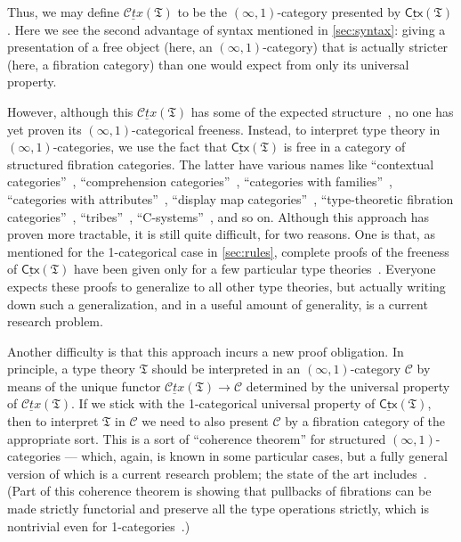 \documentclass[10pt]{article}
\def\oo{\ensuremath{\infty}}
\def\io{\ensuremath{(\oo,1)}}
\def\C{\mathscr{C}}
\def\fT{\mathfrak{T}}
\def\cCtx{\underline{\mathscr{C}\!\mathit{tx}}}
\def\cCtxT{\cCtx(\fT)}
\def\sCtx{\underline{\mathsf{Ctx}}}
\def\sCtxT{\sCtx(\fT)}
\numberwithin{equation}{section}
\begin{document}
\begin{subappendices}
Thus, we may define $\cCtxT$ to be the \io-category presented by $\sCtxT$.
Here we see the second advantage of syntax mentioned in \cref{sec:syntax}: giving a presentation of a free object (here, an \io-category) that is actually stricter (here, a fibration category) than one would expect from only its universal property.

However, although this $\cCtxT$ has some of the expected structure~\cite{kapulkin:lccqcat-tt,kl:hot-tt},
no one has yet proven its \io-categorical freeness. %
Instead, to interpret type theory in \io-categories, we use the fact that $\sCtxT$ is free in a category of structured fibration categories.
The latter have various names like
``contextual categories''~\cite{cartmell:gatcc}, ``comprehension categories''~\cite{jacobs:compr-cat}, ``categories with families''~\cite{dybjer:internal-tt}, ``categories with attributes''~\cite{cartmell:gatcc}, ``display map categories''~\cite[\S8.3]{taylor:pracfdn}, ``type-theoretic fibration categories''~\cite{shulman:invdia}, ``tribes''~\cite{joyal:tribes}, ``C-systems''~\cite{voevodsky:subquot-csys}, and so on.
Although this approach has proven more tractable, it is still quite difficult, for two reasons.
One is that, as mentioned for the 1-categorical case in \cref{sec:rules}, complete proofs of the freeness of $\sCtxT$ have been given only for a few particular type theories~\cite{streicher:semtt}.
Everyone expects these proofs to generalize to all other type theories, but actually writing down such a generalization, and in a useful amount of generality, is a current research problem.

Another difficulty is that this approach incurs a new proof obligation.
In principle, a type theory $\fT$ should be interpreted in an \io-category $\C$ by means of the unique functor $\cCtxT \to \C$ determined by the universal property of $\cCtxT$.
If we stick with the 1-categorical universal property of $\sCtxT$, then to interpret $\fT$ in $\C$ we need to also present $\C$ by a fibration category of the appropriate sort.
This is a sort of ``coherence theorem'' for structured $\io$-categories --- which, again, is known in some particular cases, but a fully general version of which is a current research problem; the state of the art includes~\cite{klv:ssetmodel,ak:htmtt,gb:topsimpid,shulman:invdia,shulman:elreedy,shulman:eiuniv,stekelenburg:modestkan,gk:univlcc,kapulkin:lccqcat-tt,lw:localuniv}.
(Part of this coherence theorem is showing that pullbacks of fibrations can be made strictly functorial and preserve all the type operations strictly, which is nontrivial even for 1-categories~\cite{curien:subst,hofmann:ttinlccc,hofmann:ssdts,cd:lccc-tt}.)


\end{subappendices}
\end{document}

